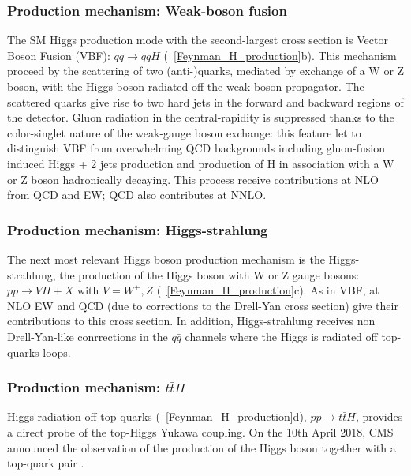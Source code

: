 \subsubsection{Production mechanism: Weak-boson fusion}
The SM Higgs production mode with the second-largest cross section is Vector Boson Fusion (VBF): $qq \to qqH$ (\figurename~\ref{Feynman_H_production}b). This mechanism proceed by the scattering of two (anti-)quarks, mediated by exchange of a W or Z boson, with the Higgs boson radiated off the weak-boson propagator. The scattered quarks give rise to two hard jets in the forward and backward regions of the detector. Gluon radiation in the central-rapidity is suppressed thanks to the color-singlet nature of the weak-gauge boson exchange: this feature let to distinguish VBF from overwhelming QCD backgrounds including gluon-fusion induced Higgs + 2 jets production and production of H in association with a W or Z boson hadronically decaying. This process receive contributions at NLO from QCD and EW; QCD also contributes at NNLO.
\subsubsection{Production mechanism: Higgs-strahlung}
The next most relevant Higgs boson production mechanism is the Higgs-strahlung, the production of the Higgs boson with W or Z gauge bosons: $pp \to VH + X$ with $V = W^{\pm},Z$ (\figurename~\ref{Feynman_H_production}c). As in VBF, at NLO EW and QCD (due to corrections to the Drell-Yan cross section) give their contributions to this cross section. In addition, Higgs-strahlung receives non Drell-Yan-like conrrections in the $q\bar{q}$ channels where the Higgs is radiated off top-quarks loops.
\subsubsection{Production mechanism: $t\bar{t}H$}
Higgs radiation off top quarks (\figurename~\ref{Feynman_H_production}d), $pp \to t\bar{t}H$, provides a direct probe of the top-Higgs Yukawa coupling. On the 10th April 2018, CMS announced the observation of the production of the Higgs boson together with a top-quark pair \cite{ttH}.

